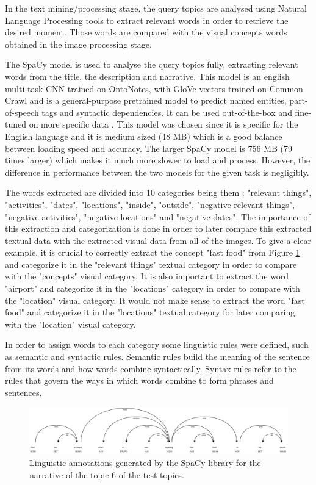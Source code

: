 In the text mining/processing stage, the query topics are analysed using Natural Language Processing tools to extract relevant words in order to retrieve the desired moment. Those words are compared with the visual concepts words obtained in the image processing stage. 

The SpaCy model \cite{Spacy2017} is used to analyse the query topics fully, extracting relevant words from the title, the description and narrative. This model is an english multi-task CNN trained on OntoNotes, with GloVe vectors trained on Common Crawl and is a general-purpose pretrained model to predict named entities, part-of-speech tags and syntactic dependencies. It can be used out-of-the-box and fine-tuned on more specific data \cite{Spacy2017}. This model was chosen since it is specific for the English language and it is medium sized (48 MB) which is a good balance between loading speed and accuracy. The larger SpaCy model is 756 MB (79 times larger) which makes it much more slower to load and process. However, the difference in performance between the two models for the given task is negligibly.




The words extracted are divided into 10 categories being them : "relevant things", "activities", "dates", "locations", "inside", "outside", "negative relevant things", "negative activities", "negative locations" and "negative dates". The importance of this extraction and categorization is done in order to later compare this extracted textual data with the extracted visual data from all of the images. To give a clear example, it is crucial to correctly extract the concept "fast food" from Figure \ref{fig:spacy_labels} and categorize it in the "relevant things" textual category in order to compare with the "concepts" visual category. It is also important to extract the word "airport" and categorize it in the "locations" category in order to compare with the "location" visual category. It would not make sense to extract the word "fast food" and categorize it in the "locations" textual category for later comparing with the "location" visual category.

In order to assign words to each category some linguistic rules were defined,
such as semantic and syntactic rules. Semantic rules build the meaning of the
sentence from its words and how words combine syntactically. Syntax rules refer to
the rules that govern the ways in which words combine to form phrases and
sentences. 

\begin{figure}[H]
    \centering
    \captionsetup{justification=centering}
    \includegraphics[width =  \textwidth]{Sections/6textprocessing/images/spacy.png}
    \caption[SpaCy linguistic annotations generated]{Linguistic annotations generated by the SpaCy library \cite{Spacy2017} for the narrative of the topic 6 of the test topics.}
    \label{fig:spacy_labels}
  \end{figure}


